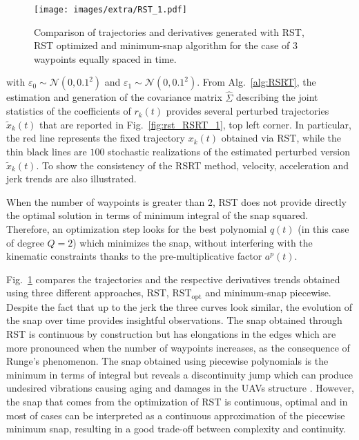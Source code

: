 \begin{figure}
\texttt{[image: images/extra/RST\_1.pdf]}
\centering
\caption{Comparison of trajectories and derivatives generated with RST, RST optimized and minimum-snap algorithm for the case of $3$ waypoints equally spaced in time.}
\label{fig:rst_RST_1}
\end{figure}

with $\varepsilon_0 \sim \mathcal{N}(0,0.1^2)$ and $\varepsilon_1 \sim \mathcal{N}(0,0.1^2)$. From Alg.~\ref{alg:RSRT}, the estimation and generation of the covariance matrix $\hat{\Sigma}$ describing the joint statistics of the coefficients of $r_k(t)$ provides several perturbed trajectories $\tilde{x}_k(t)$ that are reported in Fig.~\ref{fig:rst_RSRT_1}, top left corner. In particular, the red line represents the fixed trajectory $x_k(t)$ obtained via RST, while the thin black lines are $100$ stochastic realizations of the estimated perturbed version $\tilde{x}_k(t)$. To show the consistency of the RSRT method, velocity, acceleration and jerk trends are also illustrated.



When the number of waypoints is greater than $2$, RST does not provide directly the optimal solution in terms of minimum integral of the snap squared. Therefore, an optimization step looks for the best polynomial $q(t)$ (in this case of degree $Q = 2$) which minimizes the snap, without interfering with the kinematic constraints thanks to the pre-multiplicative factor $a^p(t)$. 

Fig.~\ref{fig:rst_RST_1} compares the trajectories and the respective derivatives trends obtained using three different approaches, RST, RST$_{\text{opt}}$ and minimum-snap piecewise. Despite the fact that up to the jerk the three curves look similar, the evolution of the snap over time provides insightful observations. The snap obtained through RST is continuous by construction but has elongations in the edges which are more pronounced when the number of waypoints increases, as the consequence of Runge's phenomenon. The snap obtained using piecewise polynomials is the minimum in terms of integral but reveals a discontinuity jump which can produce undesired vibrations causing aging and damages in the UAVs structure \cite{Letizia2020_rst}. However, the snap that comes from the optimization of RST is continuous, optimal and in most of cases can be interpreted as a continuous approximation of the piecewise minimum snap, resulting in a good trade-off between complexity and continuity.

